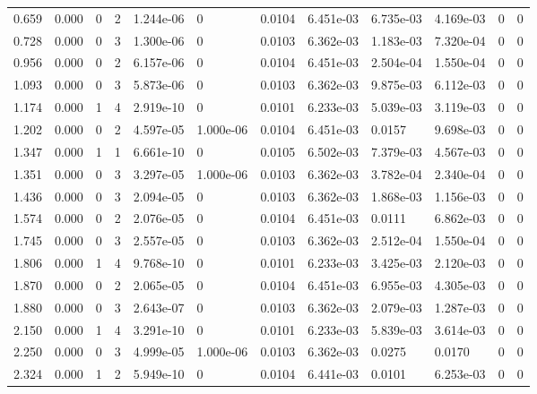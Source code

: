 \documentclass[preview]{standalone}
\begin{document}
{{\begin{tabular}{L{1.2cm}C{1.2cm} C{0.3cm}C{0.5cm} C{1.4cm}C{1.4cm} C{1.4cm}C{1.4cm} C{1.6cm}C{1.6cm} C{1.6cm}C{1.6cm}}
  0.659  &  0.000  & 0     &  2 &  1.244e-06  & 0  &  0.0104&   6.451e-03& 6.735e-03 & 4.169e-03   &  0 & 0  \\ 
  0.728  &  0.000  & 0     &  3 &  1.300e-06  & 0  &  0.0103&   6.362e-03& 1.183e-03 & 7.320e-04   &  0 & 0  \\ 
  0.956  &  0.000  & 0     &  2 &  6.157e-06  & 0  &  0.0104&   6.451e-03& 2.504e-04 & 1.550e-04   &  0 & 0  \\ 
  1.093  &  0.000  & 0     &  3 &  5.873e-06  & 0  &  0.0103&   6.362e-03& 9.875e-03 & 6.112e-03   &  0 & 0  \\ 
  1.174  &  0.000  & 1     &  4 &  2.919e-10  & 0  &  0.0101&   6.233e-03& 5.039e-03 & 3.119e-03   &  0 & 0  \\ 
  1.202  &  0.000  & 0     &  2 &  4.597e-05  & 1.000e-06  &  0.0104&   6.451e-03& 0.0157 & 9.698e-03   &  0 & 0  \\ 
  1.347  &  0.000  & 1     &  1 &  6.661e-10  & 0  &  0.0105&   6.502e-03& 7.379e-03 & 4.567e-03   &  0 & 0  \\ 
  1.351  &  0.000  & 0     &  3 &  3.297e-05  & 1.000e-06  &  0.0103&   6.362e-03& 3.782e-04 & 2.340e-04   &  0 & 0  \\ 
  1.436  &  0.000  & 0     &  3 &  2.094e-05  & 0  &  0.0103&   6.362e-03& 1.868e-03 & 1.156e-03   &  0 & 0  \\ 
  1.574  &  0.000  & 0     &  2 &  2.076e-05  & 0  &  0.0104&   6.451e-03& 0.0111 & 6.862e-03   &  0 & 0  \\ 
  1.745  &  0.000  & 0     &  3 &  2.557e-05  & 0  &  0.0103&   6.362e-03& 2.512e-04 & 1.550e-04   &  0 & 0  \\ 
  1.806  &  0.000  & 1     &  4 &  9.768e-10  & 0  &  0.0101&   6.233e-03& 3.425e-03 & 2.120e-03   &  0 & 0  \\ 
  1.870  &  0.000  & 0     &  2 &  2.065e-05  & 0  &  0.0104&   6.451e-03& 6.955e-03 & 4.305e-03   &  0 & 0  \\ 
  1.880  &  0.000  & 0     &  3 &  2.643e-07  & 0  &  0.0103&   6.362e-03& 2.079e-03 & 1.287e-03   &  0 & 0  \\ 
  2.150  &  0.000  & 1     &  4 &  3.291e-10  & 0  &  0.0101&   6.233e-03& 5.839e-03 & 3.614e-03   &  0 & 0  \\ 
  2.250  &  0.000  & 0     &  3 &  4.999e-05  & 1.000e-06  &  0.0103&   6.362e-03& 0.0275 & 0.0170   &  0 & 0  \\ 
  2.324  &  0.000  & 1     &  2 &  5.949e-10  & 0  &  0.0104&   6.441e-03& 0.0101 & 6.253e-03   &  0 & 0  \\ 

\end{tabular}}}
\end{document}
